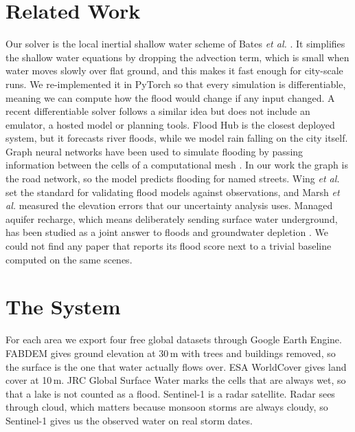 \documentclass[conference]{IEEEtran}
\begin{document}
\section{Related Work}
\label{sec:related}
Our solver is the local inertial shallow water scheme of Bates \emph{et al.} \cite{bates2010}. It
simplifies the shallow water equations by dropping the advection term, which is small when water
moves slowly over flat ground, and this makes it fast enough for city-scale runs. We re-implemented
it in PyTorch so that every simulation is differentiable, meaning we can compute how the flood would
change if any input changed. A recent differentiable solver \cite{li2026inunda} follows a similar
idea but does not include an emulator, a hosted model or planning tools. Flood Hub
\cite{nearing2024} is the closest deployed system, but it forecasts river floods, while we model
rain falling on the city itself. Graph neural networks have been used to simulate flooding by
passing information between the cells of a computational mesh \cite{bentivoglio2023swegnn}. In our
work the graph is the road network, so the model predicts flooding for named streets. Wing
\emph{et al.} \cite{wing2017} set the standard for validating flood models against observations,
and Marsh \emph{et al.} \cite{marsh2024} measured the elevation errors that our uncertainty analysis
uses. Managed aquifer recharge, which means deliberately sending surface water underground, has been
studied as a joint answer to floods and groundwater depletion \cite{pavelic2015utfi}. We could not
find any paper that reports its flood score next to a trivial baseline computed on the same scenes.

\section{The System}
\label{sec:system}
For each area we export four free global datasets through Google Earth Engine. FABDEM
\cite{hawker2022fabdem} gives ground elevation at 30\,m with trees and buildings removed, so the
surface is the one that water actually flows over. ESA WorldCover \cite{zanaga2021worldcover} gives
land cover at 10\,m. JRC Global Surface Water \cite{pekel2016} marks the cells that are always wet,
so that a lake is not counted as a flood. Sentinel-1 \cite{torres2012} is a radar satellite. Radar
sees through cloud, which matters because monsoon storms are always cloudy, so Sentinel-1 gives us
the observed water on real storm dates.
\end{document}
